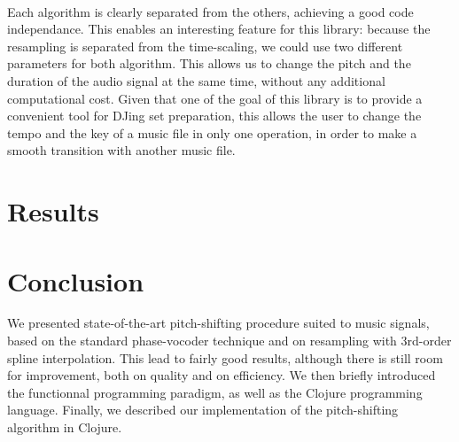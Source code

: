 \documentclass[letterpaper]{article}
\theoremstyle{definition}
\theoremstyle{remark}
\theoremstyle{plain}
\begin{document}
\paragraph{}
Each algorithm is clearly separated from the others, achieving a good code
independance. This enables an interesting feature for this library: because the
resampling is separated from the time-scaling, we could use two different
parameters for both algorithm. This allows us to change the pitch and the
duration of the audio signal at the same time, without any additional
computational cost. Given that one of the goal of this library is to provide a
convenient tool for DJing set preparation, this allows the user to change the
tempo and the key of a music file in only one operation, in order to make a
smooth transition with another music file.

\section{Results}

\section{Conclusion}
We presented state-of-the-art pitch-shifting procedure suited to music signals,
based on the standard phase-vocoder technique and on resampling with 3rd-order
spline interpolation. This lead to fairly good results, although there is still
room for improvement, both on quality and on efficiency. We then briefly
introduced the functionnal programming paradigm, as well as the Clojure
programming language. Finally, we described our implementation of the
pitch-shifting algorithm in Clojure.

\footnotesize


\end{document}
